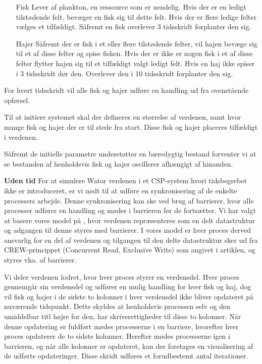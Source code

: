 \begin{itemize}
\item[Fisk]
Lever af plankton, en ressource som er uendelig. Hvis der er en ledigt 
tilstødende felt, bevæger en fisk sig til dette felt. Hvis der er flere ledige 
felter vælges et tilfældigt. Såfremt en fisk overlever 3 tidsskridt forplanter 
den sig.
\item[Hajer]
Såfremt der er fisk i et eller flere tilstødende felter, vil hajen bevæge sig 
til et af disse felter og spise fisken. Hvis der er ikke er nogen fisk i et af 
disse felter flytter hajen sig til et tilfældigt valgt ledigt felt. Hvis en haj 
ikke spiser i 3 tidsskridt dør den. Overlever den i 10 tidsskridt forplanter 
den sig.
\end{itemize}


For hvert tidsskridt vil alle fisk og hajer udføre en handling ud fra
ovenstående opførsel.

Til at initiere systemet skal der defineres en størrelse af verdenen,
samt hvor mange fisk og hajer der er til stede fra start. Disse fisk og
hajer placeres tilfældigt i verdenen.

Såfremt de initielle parametre understøtter en bæredygtig bestand
forventer vi at se bestanden af henholdsvis fisk og hajer oscillerer
afhængigt af hinanden.


\textbf{Uden tid}
For at simulere Wator verdenen i et CSP-system hvori tidsbegrebet ikke er 
introduceret, er vi nødt til at udføre en synkronisering af de enkelte 
processers arbejde. Denne synkronisering kan ske ved brug af barrierer, hvor 
alle processer udfører en handling og mødes i barrieren før de fortsætter.
Vi har valgt at basere vores model på \cite{crew}, hvor verdenen repræsenteres 
som en delt datastruktur og adgangen til denne styres med barrierer. I vores 
model er hver proces derved ansvarlig for en del af verdenen og tilgangen til 
den delte datastruktur sker ud fra CREW-princippet (Concurrent Read, Exclusive 
Write) som angivet i artiklen, og styres vha. af barrierer. 

Vi deler verdenen lodret, hvor hver proces styrer en verdensdel. Hver proces 
gennemgår sin verdensdel og udfører en mulig handling for hver fisk og haj, dog 
vil fisk og hajer i de sidste to kolonner i hver verdensdel ikke bliver 
opdateret på nuværende tidspunkt. Dette skyldes at henholdsvis processen selv 
og den umiddelbar titl højre for den, har skriverettigheder til disse to 
kolonner.
Når denne opdatering er fuldført mødes processerne i en barriere, hvorefter 
hver proces opdaterer de to sidste kolonner. Herefter mødes processerne igen i 
barrieren, og når alle kolonner er opdateret, kan der foretages en 
visualisering af de udførte opdateringer. Disse skridt udføres et forudbestemt 
antal iterationer. 



